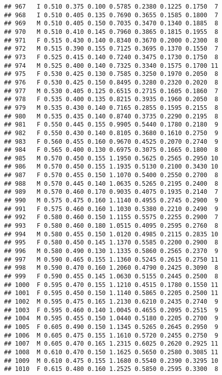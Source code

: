 \documentclass[
]{article}
\begin{document}
\begin{verbatim}
## 967   I 0.510 0.375 0.100 0.5785 0.2380 0.1225 0.1750  7
## 968   I 0.510 0.405 0.135 0.7690 0.3655 0.1585 0.1800  7
## 969   M 0.510 0.405 0.150 0.7035 0.3470 0.1340 0.1885  8
## 970   M 0.510 0.410 0.145 0.7960 0.3865 0.1815 0.1955  8
## 971   F 0.515 0.430 0.140 0.8340 0.3670 0.2000 0.2300  8
## 972   M 0.515 0.390 0.155 0.7125 0.3695 0.1370 0.1550  7
## 973   F 0.525 0.415 0.140 0.7240 0.3475 0.1730 0.1750  8
## 974   M 0.525 0.400 0.140 0.7325 0.3340 0.1575 0.1700 11
## 975   F 0.530 0.425 0.130 0.7585 0.3250 0.1970 0.2050  8
## 976   F 0.530 0.425 0.150 0.8495 0.3280 0.2320 0.2020  8
## 977   M 0.530 0.405 0.125 0.6515 0.2715 0.1605 0.1860  7
## 978   F 0.535 0.400 0.135 0.8215 0.3935 0.1960 0.2050  8
## 979   M 0.535 0.430 0.140 0.7165 0.2855 0.1595 0.2155  8
## 980   M 0.535 0.435 0.140 0.8740 0.3735 0.2290 0.2195  8
## 981   F 0.550 0.445 0.155 0.9905 0.5440 0.1780 0.2180  9
## 982   F 0.550 0.430 0.140 0.8105 0.3680 0.1610 0.2750  9
## 983   F 0.560 0.455 0.160 0.9670 0.4525 0.2070 0.2740  9
## 984   F 0.565 0.400 0.130 0.6975 0.3075 0.1665 0.1800  8
## 985   M 0.570 0.450 0.155 1.1950 0.5625 0.2565 0.2950 10
## 986   M 0.570 0.450 0.155 1.1935 0.5130 0.2100 0.3430 10
## 987   F 0.570 0.455 0.150 1.1070 0.5400 0.2550 0.2700  8
## 988   M 0.570 0.445 0.140 1.0635 0.5265 0.2195 0.2400  8
## 989   M 0.570 0.460 0.170 0.9035 0.4075 0.1935 0.2140  7
## 990   M 0.575 0.475 0.160 1.1140 0.4955 0.2745 0.2900  9
## 991   F 0.575 0.460 0.160 1.1030 0.5380 0.2210 0.2490  9
## 992   F 0.580 0.460 0.150 1.1155 0.5575 0.2255 0.2900  7
## 993   F 0.580 0.460 0.180 1.0515 0.4095 0.2595 0.2760  8
## 994   M 0.580 0.455 0.150 1.0120 0.4985 0.2115 0.2835 10
## 995   F 0.580 0.450 0.145 1.1370 0.5585 0.2200 0.2900  8
## 996   M 0.580 0.490 0.130 1.1335 0.5860 0.2565 0.2370  9
## 997   M 0.590 0.465 0.155 1.1360 0.5245 0.2615 0.2750 11
## 998   M 0.590 0.470 0.160 1.2060 0.4790 0.2425 0.3090  8
## 999   F 0.590 0.455 0.145 1.0630 0.5155 0.2445 0.2500  8
## 1000  F 0.595 0.470 0.155 1.1210 0.4515 0.1780 0.1550 11
## 1001  F 0.595 0.450 0.150 1.1140 0.5865 0.2205 0.2500 11
## 1002  M 0.595 0.475 0.165 1.2130 0.6210 0.2435 0.2740  9
## 1003  F 0.595 0.460 0.140 1.0045 0.4655 0.2095 0.2515  9
## 1004  M 0.595 0.455 0.150 1.0440 0.5180 0.2205 0.2700  9
## 1005  F 0.605 0.490 0.150 1.1345 0.5265 0.2645 0.2950  9
## 1006  M 0.605 0.475 0.155 1.1610 0.5720 0.2455 0.2750  9
## 1007  M 0.605 0.470 0.165 1.2315 0.6025 0.2620 0.2925 11
## 1008  M 0.610 0.470 0.150 1.1625 0.5650 0.2580 0.3085 11
## 1009  M 0.610 0.475 0.155 1.1680 0.5540 0.2390 0.3295 10
## 1010  F 0.615 0.480 0.160 1.2525 0.5850 0.2595 0.3300  8

\end{verbatim}
\end{document}
